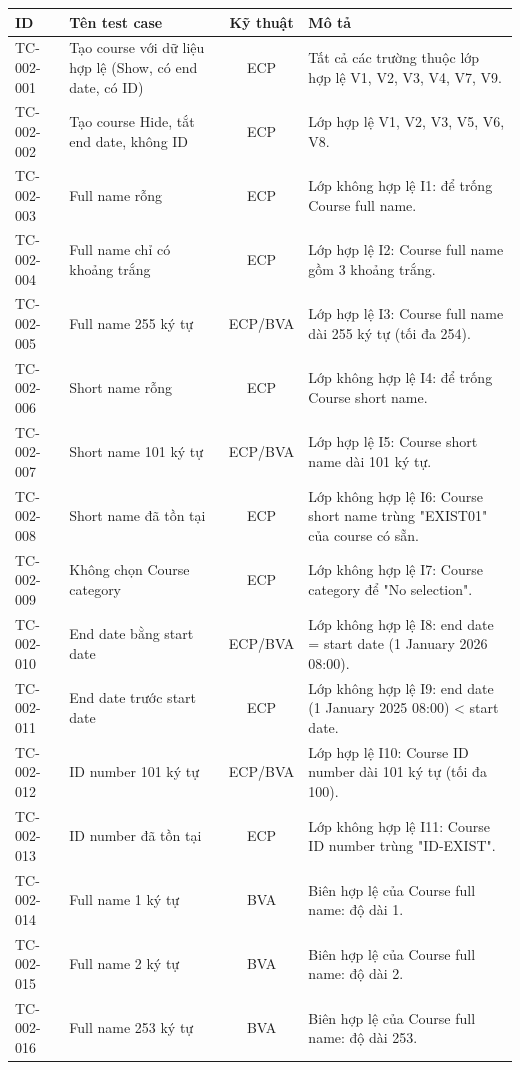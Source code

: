 {\footnotesize
\begin{longtable}{|l|L{4.4cm}|c|L{6.4cm}|}
\hline
{}\textbf{ID} & \textbf{Tên test case} & \textbf{Kỹ thuật} & \textbf{Mô tả} \\ \hline
\endhead
TC-002-001 & Tạo course với dữ liệu hợp lệ (Show, có end date, có ID) & ECP & Tất cả các trường thuộc lớp hợp lệ V1, V2, V3, V4, V7, V9. \\ \hline
TC-002-002 & Tạo course Hide, tắt end date, không ID & ECP & Lớp hợp lệ V1, V2, V3, V5, V6, V8. \\ \hline
TC-002-003 & Full name rỗng & ECP & Lớp không hợp lệ I1: để trống Course full name. \\ \hline
TC-002-004 & Full name chỉ có khoảng trắng & ECP & Lớp hợp lệ I2: Course full name gồm 3 khoảng trắng. \\ \hline
TC-002-005 & Full name 255 ký tự & ECP/BVA & Lớp hợp lệ I3: Course full name dài 255 ký tự (tối đa 254). \\ \hline
TC-002-006 & Short name rỗng & ECP & Lớp không hợp lệ I4: để trống Course short name. \\ \hline
TC-002-007 & Short name 101 ký tự & ECP/BVA & Lớp hợp lệ I5: Course short name dài 101 ký tự. \\ \hline
TC-002-008 & Short name đã tồn tại & ECP & Lớp không hợp lệ I6: Course short name trùng "EXIST01" của course có sẵn. \\ \hline
TC-002-009 & Không chọn Course category & ECP & Lớp không hợp lệ I7: Course category để "No selection". \\ \hline
TC-002-010 & End date bằng start date & ECP/BVA & Lớp không hợp lệ I8: end date = start date (1 January 2026 08:00). \\ \hline
TC-002-011 & End date trước start date & ECP & Lớp không hợp lệ I9: end date (1 January 2025 08:00) \textless{} start date. \\ \hline
TC-002-012 & ID number 101 ký tự & ECP/BVA & Lớp hợp lệ I10: Course ID number dài 101 ký tự (tối đa 100). \\ \hline
TC-002-013 & ID number đã tồn tại & ECP & Lớp không hợp lệ I11: Course ID number trùng "ID-EXIST". \\ \hline
TC-002-014 & Full name 1 ký tự & BVA & Biên hợp lệ của Course full name: độ dài 1. \\ \hline
TC-002-015 & Full name 2 ký tự & BVA & Biên hợp lệ của Course full name: độ dài 2. \\ \hline
TC-002-016 & Full name 253 ký tự & BVA & Biên hợp lệ của Course full name: độ dài 253. \\ \hline

\end{longtable}}

